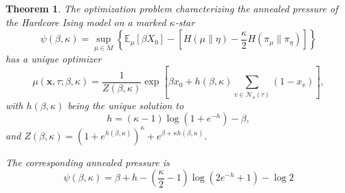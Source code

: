 \documentclass[12pt]{article}
\newtheorem{theorem}{Theorem}[section]
\numberwithin{equation}{section}
\begin{document}
\begin{theorem}
    The optimization problem characterizing the annealed pressure of the Hardcore Ising model on a marked $\kappa$-star
    \begin{equation*}
        \psi(\beta, \kappa) = \sup_{\mu\in M} \left\{\mathbb{E}_\mu\left[\beta X_0\right] - \left[H(\mu\|\eta) - \frac\kappa2 H(\pi_\mu\| \pi_\eta)\right]\right\}
    \end{equation*}
    has a unique optimizer
    \begin{equation}
        \mu(\mathbf{x}, \tau; \beta, \kappa) = \frac{1}{Z(\beta, \kappa)} \exp\left[\beta x_0 + h(\beta, \kappa) \sum_{v\in\mathcal{N}_o(\tau)}(1-x_v)\right],
    \end{equation}
    with $h(\beta, \kappa)$ being the unique solution to
    \begin{equation}
        h = (\kappa-1)\log(1+e^{-h}) - \beta,
        \label{Eq.HAIS-h}
    \end{equation}
    and $Z(\beta, \kappa) = (1+e^{h(\beta, \kappa)})^\kappa + e^{\beta + \kappa h(\beta, \kappa)}$.

    The corresponding annealed pressure is
    \begin{equation}
        \psi(\beta, \kappa) = \beta + h - \left(\frac\kappa2 - 1\right) \log(2e^{-h} + 1) - \log 2
    \end{equation}
\end{theorem}
\end{document}
